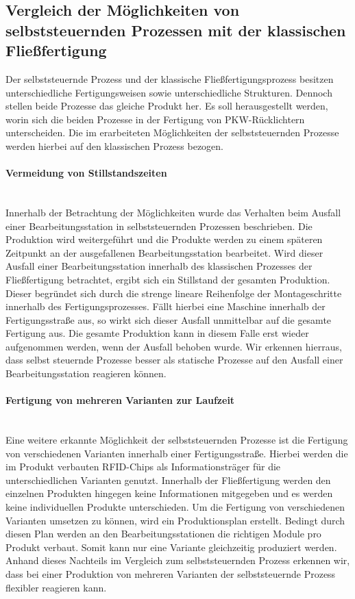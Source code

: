 \subsection{Vergleich der Möglichkeiten von selbststeuernden Prozessen mit der klassischen Fließfertigung}
\label{sec:Vergleich_der_Moeglichkeiten}

Der selbststeuernde Prozess und der klassische Fließfertigungsprozess besitzen
unterschiedliche Fertigungsweisen sowie unterschiedliche Strukturen. Dennoch
stellen beide Prozesse das gleiche Produkt her. Es soll herausgestellt werden,
worin sich die beiden Prozesse in der Fertigung von PKW-Rücklichtern
unterscheiden. Die im  erarbeiteten Möglichkeiten der
selbststeuernden Prozesse werden hierbei auf den klassischen Prozess bezogen.

\paragraph{Vermeidung von Stillstandszeiten}\hfill \\
Innerhalb der Betrachtung der Möglichkeiten wurde das Verhalten beim Ausfall
einer Bearbeitungsstation in selbststeuernden Prozessen beschrieben. Die
Produktion wird weitergeführt und die Produkte werden zu einem späteren
Zeitpunkt an der ausgefallenen Bearbeitungsstation bearbeitet. Wird dieser
Ausfall einer Bearbeitungsstation innerhalb des klassischen Prozesses der
Fließfertigung betrachtet, ergibt sich ein Stillstand der gesamten Produktion.
Dieser begründet sich durch die strenge lineare Reihenfolge der Montageschritte
innerhalb des Fertigungsprozesses. Fällt hierbei eine Maschine innerhalb der
Fertigungsstraße aus, so wirkt sich dieser Ausfall unmittelbar auf die gesamte
Fertigung aus. Die gesamte Produktion kann in diesem Falle erst wieder
aufgenommen werden, wenn der Ausfall behoben wurde. Wir erkennen hierraus, dass
selbst steuernde Prozesse besser als statische Prozesse  auf den Ausfall einer
Bearbeitungsstation reagieren können.

\paragraph{Fertigung von mehreren Varianten zur Laufzeit} \hfill \\
Eine weitere erkannte Möglichkeit der selbststeuernden Prozesse ist die
Fertigung von verschiedenen Varianten innerhalb einer Fertigungsstraße. Hierbei
werden die im Produkt verbauten RFID-Chips als Informationsträger für die
unterschiedlichen Varianten genutzt. Innerhalb der Fließfertigung werden den
einzelnen Produkten hingegen keine Informationen mitgegeben und es werden
keine individuellen Produkte unterschieden. Um die Fertigung von verschiedenen
Varianten umsetzen zu können, wird ein Produktionsplan erstellt.
Bedingt durch diesen Plan werden an den Bearbeitungsstationen die richtigen
Module pro Produkt verbaut. Somit kann nur eine Variante gleichzeitig
produziert werden. Anhand dieses Nachteils im Vergleich zum selbststeuernden
Prozess erkennen wir, dass bei einer Produktion von mehreren Varianten der
selbststeuernde Prozess flexibler reagieren kann.




